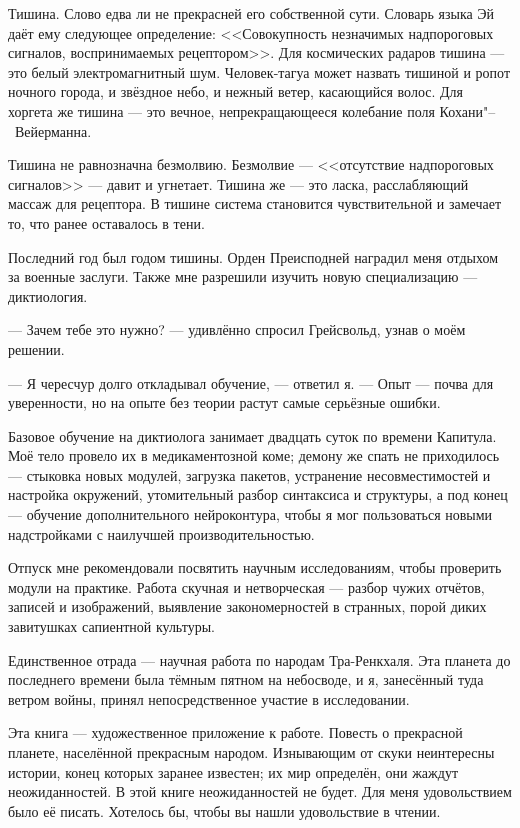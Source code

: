 Тишина.
Слово едва ли не прекрасней его собственной сути.
Словарь языка Эй даёт ему следующее определение: <<Совокупность незначимых надпороговых сигналов, воспринимаемых рецептором>>.
Для космических радаров тишина --- это белый электромагнитный шум.
Человек-тагуа может назвать тишиной и ропот ночного города, и звёздное небо, и нежный ветер, касающийся волос.
Для хоргета же тишина --- это вечное, непрекращающееся колебание поля Кохани"--~Вейерманна.

Тишина не равнозначна безмолвию.
Безмолвие --- <<отсутствие надпороговых сигналов>> --- давит и угнетает.
Тишина же --- это ласка, расслабляющий массаж для рецептора.
В тишине система становится чувствительной и замечает то, что ранее оставалось в тени.

Последний год был годом тишины.
Орден Преисподней наградил меня отдыхом за военные заслуги.
Также мне разрешили изучить новую специализацию --- диктиология.

--- Зачем тебе это нужно? --- удивлённо спросил Грейсвольд, узнав о моём решении.

--- Я чересчур долго откладывал обучение, --- ответил я.
--- Опыт --- почва для уверенности, но на опыте без теории растут самые серьёзные ошибки.

Базовое обучение на диктиолога занимает двадцать суток по времени Капитула.
Моё тело провело их в медикаментозной коме; демону же спать не приходилось --- стыковка новых модулей, загрузка пакетов, устранение несовместимостей и настройка окружений, утомительный разбор синтаксиса и структуры, а под конец --- обучение
дополнительного нейроконтура, чтобы я мог пользоваться новыми надстройками с наилучшей производительностью.

Отпуск мне рекомендовали посвятить научным исследованиям, чтобы проверить модули на практике.
Работа скучная и нетворческая --- разбор чужих отчётов, записей и изображений, выявление закономерностей в странных, порой диких завитушках сапиентной культуры.

Единственное отрада --- научная работа по народам Тра-Ренкхаля.
Эта планета до последнего времени была тёмным пятном на небосводе, и я, занесённый туда ветром войны, принял непосредственное участие в исследовании.

Эта книга --- художественное приложение к работе.
Повесть о прекрасной планете, населённой прекрасным народом.
Изнывающим от скуки неинтересны истории, конец которых заранее известен;
их мир определён, они жаждут неожиданностей.
В этой книге неожиданностей не будет.
Для меня удовольствием было её писать.
Хотелось бы, чтобы вы нашли удовольствие в чтении.

